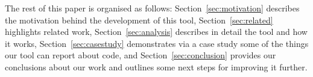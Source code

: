 The rest of this paper is organised as follows: Section~\ref{sec:motivation} describes the motivation behind the development of this tool, Section~\ref{sec:related} highlights related work, Section~\ref{sec:analysis} describes in detail the tool and how it works, Section~\ref{sec:casestudy} demonstrates via a case study some of the things our tool can report about code, and Section~\ref{sec:conclusion} provides our conclusions about our work and outlines some next steps for improving it further.
